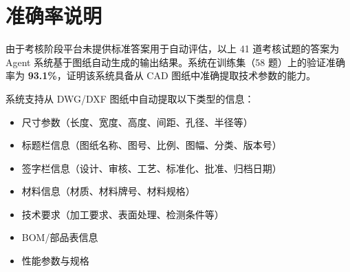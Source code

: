 \documentclass[11pt,a4paper]{article}
\begin{document}
\section{准确率说明}

由于考核阶段平台未提供标准答案用于自动评估，以上 41 道考核试题的答案为 Agent 系统基于图纸自动生成的输出结果。系统在训练集（58 题）上的验证准确率为 \textbf{93.1\%}，证明该系统具备从 CAD 图纸中准确提取技术参数的能力。

系统支持从 DWG/DXF 图纸中自动提取以下类型的信息：
\begin{itemize}[nosep]
  \item 尺寸参数（长度、宽度、高度、间距、孔径、半径等）
  \item 标题栏信息（图纸名称、图号、比例、图幅、分类、版本号）
  \item 签字栏信息（设计、审核、工艺、标准化、批准、归档日期）
  \item 材料信息（材质、材料牌号、材料规格）
  \item 技术要求（加工要求、表面处理、检测条件等）
  \item BOM/部品表信息
  \item 性能参数与规格
\end{itemize}
\end{document}
